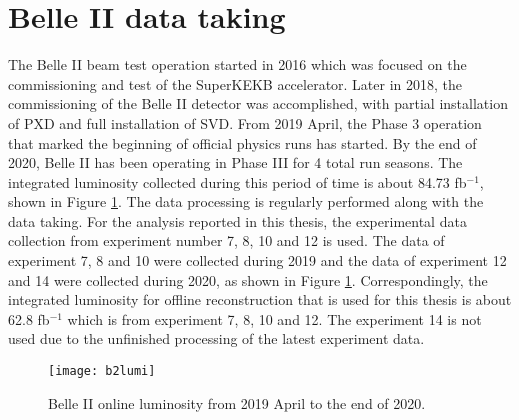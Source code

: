 \section{Belle II data taking}
The Belle II beam test operation started in 2016 which was focused on the commissioning and test of the SuperKEKB accelerator. Later in 2018, the commissioning of the Belle II detector was accomplished, with partial installation of PXD and full installation of SVD. From 2019 April, the Phase 3 operation that marked the beginning of official physics runs has started. By the end of 2020, Belle II has been operating in Phase III for 4 total run seasons. The integrated luminosity collected during this period of time is about 84.73 fb$^{-1}$, shown in Figure \ref{fig:b2lumi}. The data processing is regularly performed along with the data taking. For the analysis reported in this thesis, the experimental data collection from experiment number 7, 8, 10 and 12 is used. The data of experiment 7, 8 and 10 were collected during 2019 and the data of experiment 12 and 14 were collected during 2020, as shown in Figure \ref{fig:b2lumi}. Correspondingly, the integrated luminosity for offline reconstruction that is used for this thesis is about 62.8 fb$^{-1}$\cite{b2onlinelumi} which is from experiment 7, 8, 10 and 12. The experiment 14 is not used due to the unfinished processing of the latest experiment data. 

\begin{figure}
	\centering
	\texttt{[image: b2lumi]}
	\caption{Belle II online luminosity from 2019 April to the end of 2020\cite{b2onlinelumi}.}
	\label{fig:b2lumi} 
\end{figure}
